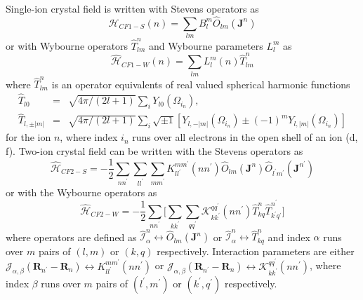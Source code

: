 \documentclass[twoside]{article}
\begin{document}
{Single-ion crystal field is written with Stevens operators as
\begin{equation}
    \hat{\mathcal{H}}_{CF1-S}(n)
    =
    \sum_{lm}
    B_l^m
    \hat{O}_{lm}(\mathbf{J}^n)
\end{equation}
or with Wybourne operators $\hat{T}_{lm}^n$ and Wybourne parameters
$L_l^m$ as
\begin{equation}
    \hat{\mathcal{H}}_{CF1-W}(n)
    =  
    \sum_{lm}
    L_l^m(n)
    \hat{T}_{lm}^{n}
\end{equation}
where $\hat{T}_{lm}^n$ is an operator equivalents of real valued spherical
harmonic functions
\begin{eqnarray}
    \hat{T}_{l0}
    &=&
    \sqrt{4\pi/(2l+1)}
    \sum_i
    Y_{l0}(\Omega_{i_n}),
    \nonumber\\
    \hat{T}_{l,\pm|m|}
    &=&
    \sqrt{4\pi/(2l+1)}
    \sum_i
    \sqrt{\pm 1}
    [Y_{l,-|m|}(\Omega_{i_n}) \pm (-1)^m Y_{l,|m|}(\Omega_{i_n})]
\end{eqnarray}
for the ion $n$, where index $i_n$ runs over all electrons in the
open shell of an ion (d, f). Two-ion crystal field can be written with the
Stevens operators as
\begin{equation}
    \hat{\mathcal{H}}_{CF2-S}
    =
    -\frac{1}{2}
    \sum_{nn^{\prime}}
    \sum_{ll^{\prime}}
    \sum_{mm^{\prime}}
    K_{ll^{\prime}}^{mm^{\prime}}(nn^{\prime})
    \hat{O}_{lm}(\mathbf{J}^n)
    \hat{O}_{l^{\prime}m^{\prime}}(\mathbf{J}^{n^{\prime}})
\end{equation}
or with the Wybourne operators  as
\begin{equation}
    \hat{\mathcal{H}}_{CF2-W}
    =
    -
    \frac{1}{2}
    \sum_{nn^{\prime}}
    \Biggl[
        \sum_{kk^{\prime}}
        \sum_{qq^{\prime}}
        \mathcal{K}_{kk^{\prime}}^{qq^{\prime}}(nn^{\prime})
        \hat{T}_{kq}^n
        \hat{T}_{k^{\prime}q^{\prime}}^{n^{\prime}}
    \Biggr]
\end{equation}
where operators are defined as $\hat{\mathcal{I}}_{\alpha}^n \leftrightarrow \hat{O}_{lm}(\mathbf{J}^n)$
or $\hat{\mathcal{I}}_{\alpha}^n \leftrightarrow \hat{T}_{kq}^n$ and 
index $\alpha$ runs over $m$ pairs of $(l,m)$ or $(k,q)$
respectively. Interaction parameters are either
$\mathcal{J}_{\alpha,\beta}(\mathbf{R}_{n^{\prime}} - \mathbf{R}_{n}) \leftrightarrow K_{ll^{\prime}}^{mm^{\prime}}(nn^{\prime})$
or
$\mathcal{J}_{\alpha,\beta}(\mathbf{R}_{n^{\prime}} - \mathbf{R}_{n}) \leftrightarrow \mathcal{K}_{kk^{\prime}}^{qq^{\prime}}(nn^{\prime})$,
where index $\beta$ runs over $m$ pairs of $(l^{\prime},m^{\prime})$ or $(k^{\prime},q^{\prime})$
respectively.


}
\end{document}
